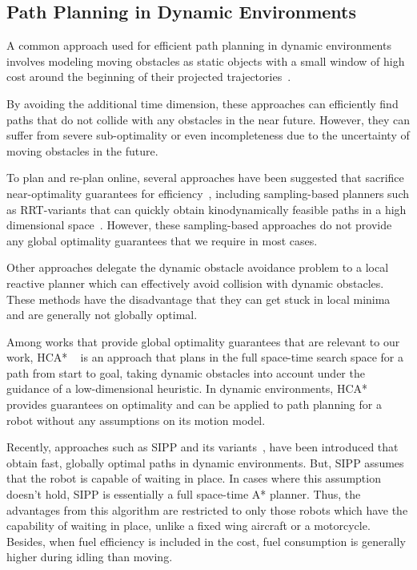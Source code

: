 \subsection{Path Planning in Dynamic Environments}

A common approach used for efficient path planning in dynamic environments involves modeling moving obstacles as static objects with a small window of high cost around the beginning of their projected trajectories~\cite{likhachev2009planning,rufli2009smooth}. 

By avoiding the additional time dimension,
these approaches can efficiently find paths that do not collide with any obstacles in the near future. However, they can suffer from severe sub-optimality or even incompleteness due to the uncertainty of moving obstacles in the future.

To plan and re-plan online, several approaches have been suggested that sacrifice near-optimality guarantees for efficiency~\cite{van2006anytime}, including sampling-based planners such as RRT-variants that can quickly obtain kinodynamically feasible paths in a high dimensional space~\cite{bekris2007greedy,petti2005safe}. However, these sampling-based approaches do not provide any global optimality guarantees that we require in most cases. 

Other approaches \cite{fox1997dynamic,brock1999high} delegate the dynamic obstacle avoidance problem to a local reactive planner which can effectively avoid collision with dynamic obstacles. These methods have the disadvantage that they can get stuck in local minima and are generally not globally optimal. 

Among works that provide global optimality guarantees that are relevant to our work, HCA* ~\cite{silver2005cooperative} is an approach that plans in the full space-time search space for a path from start to goal, taking dynamic obstacles into account under the guidance of a low-dimensional heuristic. In dynamic environments, HCA* provides guarantees on optimality and can be applied to path planning for a robot without any assumptions on its motion model.

Recently, approaches such as SIPP and its variants~\cite{phillips2011sipp,narayanan2012anytime}, have been introduced that obtain fast, globally optimal paths in dynamic environments. But, SIPP assumes that the robot is capable of waiting in place. 
In cases where this assumption doesn't hold, SIPP is essentially a full space-time A* planner. 
Thus, the advantages from this algorithm are restricted to only those robots which have the capability of waiting in place, unlike a fixed wing aircraft or a motorcycle. 
Besides, when fuel efficiency is included in the cost, fuel consumption is generally higher during idling than moving. 

